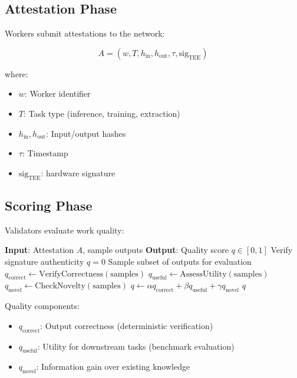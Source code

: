 \subsection{Attestation Phase}

Workers submit attestations to the network:

\begin{equation}
A = (w, T, h_{\text{in}}, h_{\text{out}}, \tau, \text{sig}_{\text{TEE}})
\end{equation}

where:
\begin{itemize}
    \item $w$: Worker identifier
    \item $T$: Task type (inference, training, extraction)
    \item $h_{\text{in}}, h_{\text{out}}$: Input/output hashes
    \item $\tau$: Timestamp
    \item $\text{sig}_{\text{TEE}}$: \TEE{} hardware signature
\end{itemize}

\subsection{Scoring Phase}

Validators evaluate work quality:

\begin{algorithm}[t]
\caption{Quality Scoring}
\label{alg:scoring}
\begin{algorithmic}[1]
\STATE \textbf{Input}: Attestation $A$, sample outputs
\STATE \textbf{Output}: Quality score $q \in [0, 1]$
\STATE Verify \TEE{} signature authenticity
    \RETURN $q = 0$
\ENDIF
\STATE Sample subset of outputs for evaluation
\STATE $q_{\text{correct}} \leftarrow \text{VerifyCorrectness}(\text{samples})$
\STATE $q_{\text{useful}} \leftarrow \text{AssessUtility}(\text{samples})$
\STATE $q_{\text{novel}} \leftarrow \text{CheckNovelty}(\text{samples})$
\STATE $q \leftarrow \alpha q_{\text{correct}} + \beta q_{\text{useful}} + \gamma q_{\text{novel}}$
\RETURN $q$
\end{algorithmic}
\end{algorithm}

Quality components:
\begin{itemize}
    \item $q_{\text{correct}}$: Output correctness (deterministic verification)
    \item $q_{\text{useful}}$: Utility for downstream tasks (benchmark evaluation)
    \item $q_{\text{novel}}$: Information gain over existing knowledge
\end{itemize}

